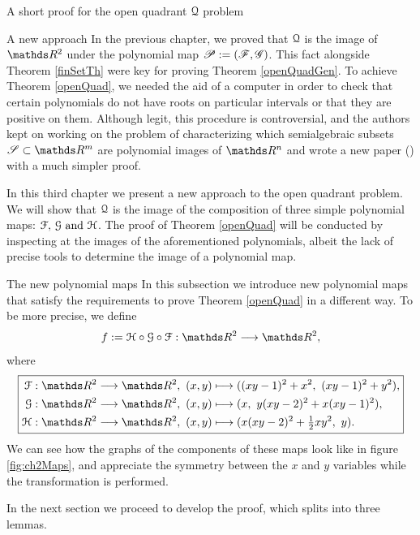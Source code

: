 \documentclass[11pt, a4paper, english, twoside, notitlepage, openright]{report}
\begin{document}
\begin{chapter}{A short proof for the open quadrant $\mathcal{Q}$ problem}
\begin{section}{A new approach}
In the previous chapter, we proved that $\mathcal{Q}$ is the image of $\R^2$ under the polynomial map $\mathscr{P}:=(\mathscr{F},\mathscr{G})$. This fact alongside Theorem \ref{finSetTh} were key for proving Theorem \ref{openQuadGen}. To achieve Theorem \ref{openQuad}, we needed the aid of a computer in order to check that certain polynomials do not have roots on particular intervals or that they are positive on them. Although legit, this procedure is controversial, and the authors kept on working on the problem of characterizing which semialgebraic subsets $\mathscr{S} \subset \R^m$ are polynomial images of $\R^n$ and wrote a new paper (\cite{fu}) with a much simpler proof.

In this third chapter we present a new approach to the open quadrant problem. We will show that $\mathcal{Q}$ is the image of the composition of three simple polynomial maps: $\mathcal{F},\, \mathcal{G} \text{ and } \mathcal{H}$. The proof of Theorem \ref{openQuad} will be conducted by inspecting at the images of the aforementioned polynomials, albeit the lack of precise tools to determine the image of a polynomial map.

\begin{subsection}{The new polynomial maps}
In this subsection we introduce new polynomial maps that satisfy the requirements to prove Theorem \ref{openQuad} in a different way. To be more precise, we define 
$$
f:=\HH\circ\GG\circ\FF:\R^2\longrightarrow \R^2,
$$
where
\begin{equation*}
\boxed{
\begin{aligned}
\FF:\R^2\longrightarrow \R^2,\ (x,y)&\longmapsto((xy-1)^2+x^2,\ (xy-1)^2+y^2), \\
\GG:\R^2\longrightarrow \R^2,\ (x,y)&\longmapsto(x,\ y(xy-2)^2+x(xy-1)^2), \\
\HH:\R^2\longrightarrow \R^2,\ (x,y)&\longmapsto(x(xy-2)^2+\tfrac{1}{2}xy^2,\ y). \\
\end{aligned}
}
\end{equation*}
We can see how the graphs of the components of these maps look like in figure \ref{fig:ch2Maps}, and appreciate the symmetry between the $x$ and $y$ variables while the transformation is performed.

\vspace{1mm}

In the next section we proceed to develop the proof, which splits into three lemmas.


\end{subsection}
\end{section}
\end{chapter}
\end{document}
